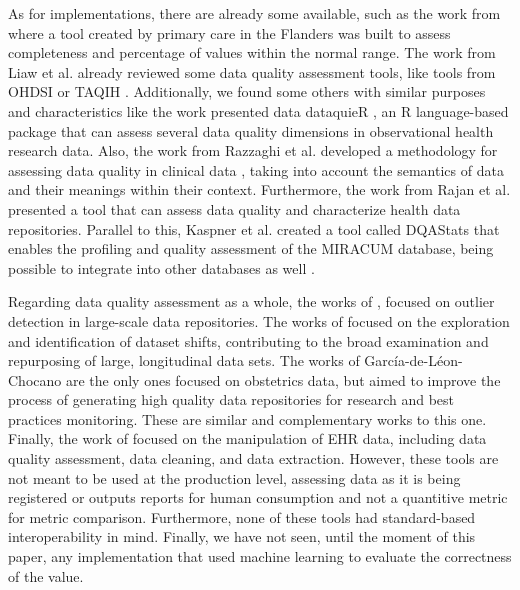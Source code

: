 As for implementations, there are already some available, such as the work from \cite{phanAutomatedDataCleaning2020} where a tool created by primary care in the Flanders was built to assess completeness and percentage of values within the normal range.
The work from Liaw et al. \cite{liawQualityAssessmentRealworld2021} already reviewed some data quality assessment tools, like tools from OHDSI \cite{hripcsakObservationalHealthData2015} or TAQIH \cite{alvarezsanchezTAQIHToolTabular2019}. 
Additionally, we found some others with similar purposes and characteristics like the work presented data dataquieR \cite{schmidtFacilitatingHarmonizedData2021}, an R language-based package that can assess several data quality dimensions in observational health research data. 
Also, the work from Razzaghi et al. developed a methodology for assessing data quality in clinical data \cite{razzaghiDevelopingSystematicApproach2022}, taking into account the semantics of data and their meanings within their context. Furthermore, the work from Rajan et al. \cite{rajanContentAgnosticComputable2019} presented a tool that can assess data quality and characterize health data repositories. Parallel to this, Kaspner et al. created a tool called DQAStats that enables the profiling and quality assessment of the MIRACUM database, being possible to integrate into other databases as well \cite{kapsnerLinkingConsortiumWideData2021a}.

Regarding data quality assessment as a whole, the works of \cite{estiriSemisupervisedEncodingOutlier2019}, focused on outlier detection in large-scale data repositories. The works of \cite{saezEHRtemporalVariabilityDelineatingTemporal2020} focused on the exploration and identification of dataset shifts, contributing to the broad examination and repurposing of large, longitudinal data sets. The works of García-de-Léon-Chocano \cite{saStandardizedDataQuality2017,garcia-de-leon-chocanoConstructionQualityassuredInfant2016,garci;a-de-leon-chocanoConstructionQualityassuredInfant2015} are the only ones focused on obstetrics data, but aimed to improve the process of generating high quality data repositories for research and best practices monitoring. These are similar and complementary works to this one. Finally, the work of \cite{springateREHRPackageManipulating2017} focused on the manipulation of EHR data, including data quality assessment, data cleaning, and data extraction. However, these tools are not meant to be used at the production level, assessing data as it is being registered or outputs reports for human consumption and not a quantitive metric for metric comparison. Furthermore, none of these tools had standard-based interoperability in mind. Finally, we have not seen, until the moment of this paper, any implementation that used machine learning to evaluate the correctness of the value.
